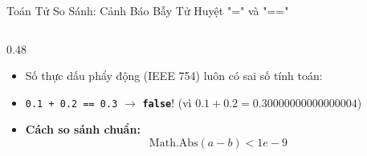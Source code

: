 \documentclass[aspectratio=169, 10pt]{beamer}
\begin{document}
\begin{frame}[fragile]{Toán Tử So Sánh: Cảnh Báo Bẫy Tử Huyệt "=" và "=="}
\begin{columns}[T]
    \begin{column}{0.48\textwidth}
      \begin{tcolorbox}[colback=UniLightBlue!30,colframe=UniBlue,title=\textbf{So sánh số thực double với sai số Epsilon},fonttitle=\small\bfseries]
        \begin{itemize}\footnotesize
          \item Số thực dấu phẩy động (IEEE 754) luôn có sai số tính toán:
          \item \texttt{0.1 + 0.2 == 0.3} $\to$ \textbf{\texttt{false}}! (vì $0.1+0.2 = 0.30000000000000004$)
          \item \textbf{Cách so sánh chuẩn:}
            $$\text{Math.Abs}(a - b) < 1e-9$$
        \end{itemize}
      \end{tcolorbox}
    \end{column}
  \end{columns}
\end{frame}
\end{document}
